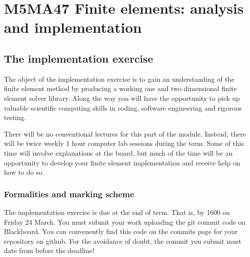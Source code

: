\documentclass{book}
\begin{document}
\label{\detokenize{index::doc}}


\frontmatter


\chapter{M5MA47 Finite elements: analysis and implementation}
\label{\detokenize{index:finite-elements-analysis-and-implementation}}\label{\detokenize{index:m5ma47-finite-elements-analysis-and-implementation}}

\section{The implementation exercise}
\label{\detokenize{index:the-implementation-exercise}}
The object of the implementation exercise is to gain an understanding
of the finite element method by producing a working one and two
dimensional finite element solver library. Along the way you will have
the opportunity to pick up valuable scientific computing skills in
coding, software engineering and rigorous testing.

There will be no conventional lectures for this part of the
module. Instead, there will be twice weekly 1 hour computer lab sessions
during the term. Some of this time will involve explanations at the
board, but much of the time will be an opportunity to develop your
finite element implementation and receive help on how to do so.


\subsection{Formalities and marking scheme}
\label{\detokenize{index:formalities-and-marking-scheme}}
The implementation exercise is due at the end of term. That is, by
1600 on Friday 24 March. You must submit your work uploading the git
commit code on Blackboard. You can convenently find this code on the
commits page for your repository on github. For the avoidance of
doubt, the commit you submit must date from before the deadline!
\end{document}
